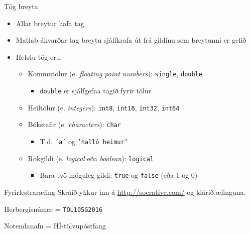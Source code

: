 \documentclass{beamer}
\begin{document}
\begin{frame}{Tög breyta}
\begin{itemize}
 \item Allar breytur hafa tag
 \item Matlab ákvarðar tag breytu sjálfkrafa út frá gildinu sem breytunni er gefið
 \item Helstu tög eru:
 \begin{itemize}
  \item Kommutölur (e. \emph{floating point numbers}):  \texttt{single}, \texttt{double}
  \begin{itemize}
   \item \texttt{double} er sjálfgefna tagið fyrir tölur
  \end{itemize}
  \item Heiltölur (e. \emph{integers}): \texttt{int8}, \texttt{int16}, \texttt{int32}, \texttt{int64}
  \item Bókstafir (e. \emph{characters}): \texttt{char}
  \begin{itemize}
   \item T.d. \texttt{'a'} og \texttt{'halló heimur'}
  \end{itemize}
  \item Rökgildi (e. \emph{logical} eða \emph{boolean}): \texttt{logical}
  \begin{itemize}
   \item Bara tvö möguleg gildi: \texttt{true} og \texttt{false} (eða 1 og 0)
  \end{itemize}
 \end{itemize}
\end{itemize}
\end{frame}

\begin{frame}{Fyrirlestraræfing}
Skráið ykkur inn á \url{http://socrative.com/} og klárið æfinguna.

Herbergisnúmer = \texttt{TOL105G2016}

Notendanafn = HÍ-tölvupóstfang
\end{frame}
\end{document}
